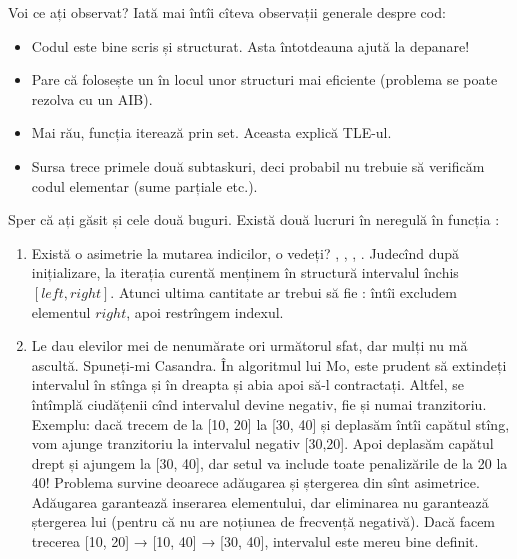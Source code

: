 \documentclass[../main.tex]{subfiles}
\begin{document}
Voi ce ați observat? Iată mai întîi cîteva observații generale despre cod:

\begin{itemize}
  \item Codul este bine scris și structurat. Asta întotdeauna ajută la depanare!

  \item Pare că folosește un  în locul unor structuri mai eficiente (problema se poate rezolva cu un AIB).

  \item Mai rău, funcția  iterează prin set. Aceasta explică TLE-ul.

  \item Sursa trece primele două subtaskuri, deci probabil nu trebuie să verificăm codul elementar (sume parțiale etc.).
\end{itemize}

Sper că ați găsit și cele două buguri. Există două lucruri în neregulă în funcția :

\begin{enumerate}
  \item Există o asimetrie la mutarea indicilor, o vedeți? , , , . Judecînd după inițializare, la iterația curentă menținem în structură intervalul închis $[left, right]$. Atunci ultima cantitate ar trebui să fie : întîi excludem elementul $right$, apoi restrîngem indexul.

  \item Le dau elevilor mei de nenumărate ori următorul sfat, dar mulți nu mă ascultă. Spuneți-mi Casandra.  În algoritmul lui Mo, este prudent să extindeți intervalul în stînga și în dreapta și abia apoi să-l contractați. Altfel, se întîmplă ciudățenii cînd intervalul devine negativ, fie și numai tranzitoriu. Exemplu: dacă trecem de la [10, 20] la [30, 40] și deplasăm întîi capătul stîng, vom ajunge tranzitoriu la intervalul negativ [30,20]. Apoi deplasăm capătul drept și ajungem la [30, 40], dar setul  va include toate penalizările de la 20 la 40! Problema survine deoarece adăugarea și ștergerea din  sînt asimetrice. Adăugarea garantează inserarea elementului, dar eliminarea nu garantează ștergerea lui (pentru că nu are noțiunea de frecvență negativă). Dacă facem trecerea [10, 20] → [10, 40] → [30, 40], intervalul este mereu bine definit.
\end{enumerate}
\end{document}
